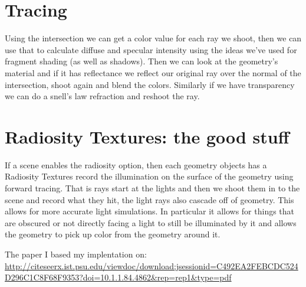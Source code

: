 \documentclass{article}
\begin{document}
\section{Tracing}
Using the intersection we can get a color value for each ray we shoot, then we can use that to calculate diffuse and specular intensity using the ideas we've used for fragment shading (as well as shadows). Then we can look at the geometry's material and if it has reflectance we reflect our original ray over the normal of the intersection, shoot again and blend the colors. Similarly if we have transparency we can do a snell's law refraction and reshoot the ray.

\section{Radiosity Textures: the good stuff}
If a scene enables the radiosity option, then each geometry objects has a Radiosity Textures record the illumination on the surface of the geometry using forward tracing. That is rays start at the lights and then we shoot them in to the scene and record what they hit, the light rays also cascade off of geometry. This allows for more accurate light simulations. In particular it allows for things that are obscured or not directly facing a light to still be illuminated by it and allows the geometry to pick up color from the geometry around it.

The paper I based my implentation on: \url{http://citeseerx.ist.psu.edu/viewdoc/download;jsessionid=C492EA2FEBCDC524D296C1C8F68F9353?doi=10.1.1.84.4862&rep=rep1&type=pdf} 
\end{document}
